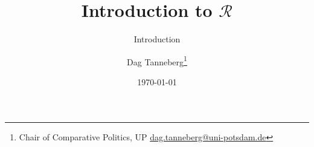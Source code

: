 \usepackage[utf8]{inputenc}
\usepackage{hyperref}
\usepackage{graphicx}
\usepackage{booktabs}

\title{Introduction to $\mathcal{R}$}
\subtitle{Introduction}
\author{Dag Tanneberg\thanks{%
  Chair of Comparative Politics, UP %
  \href{mailto:dag.tanneberg@uni-potsdam.de}%
    {dag.tanneberg@uni-potsdam.de}
  }
}
\date{\today}
